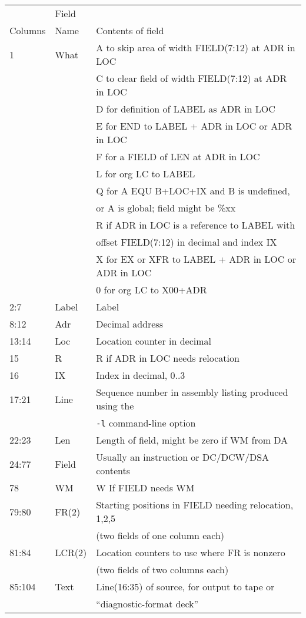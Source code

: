 \documentclass[12pt,twoside]{article}
\begin{document}
\begin{longtable}{lll}
           & Field & \\
Columns    & Name  & Contents of field \\
\hline
  1   & What    & A to skip area of width FIELD(7:12) at ADR in LOC\\
      &         & C to clear field of width FIELD(7:12) at ADR in LOC\\
      &         & D for definition of LABEL as ADR in LOC\\
      &         & E for END to LABEL + ADR in LOC or ADR in LOC\\
      &         & F for a FIELD of LEN at ADR in LOC\\
      &         & L for org LC to LABEL\\
      &         & Q for A EQU B+LOC+IX and B is undefined,\\
      &         &   or A is global; field might be \%xx\\
      &         & R if ADR in LOC is a reference to LABEL with\\
      &         &   offset FIELD(7:12) in decimal and index IX\\
      &         & X for EX or XFR to LABEL + ADR in LOC or ADR in LOC\\
      &         & 0 for org LC to X00+ADR\\
2:7   & Label   & Label\\
8:12  & Adr     & Decimal address\\
13:14 & Loc     & Location counter in decimal\\
15    & R       & R if ADR in LOC needs relocation\\
16    & IX      & Index in decimal, 0..3\\
17:21 & Line    & Sequence number in assembly listing produced using the \\
      &         & {\tt -l} command-line option\\
22:23 & Len     & Length of field, might be zero if WM from DA\\
24:77 & Field   & Usually an instruction or DC/DCW/DSA contents\\
78    & WM      & W If FIELD needs WM\\
79:80 & FR(2)   & Starting positions in FIELD needing relocation, 1,2,5\\
      &         & (two fields of one column each) \\
81:84 & LCR(2)  & Location counters to use where FR is nonzero\\
      &         & (two fields of two columns each) \\
85:104&  Text   & Line(16:35) of source, for output to tape or \\
      &         & ``diagnostic-format deck''\\
\end{longtable}
\end{document}
